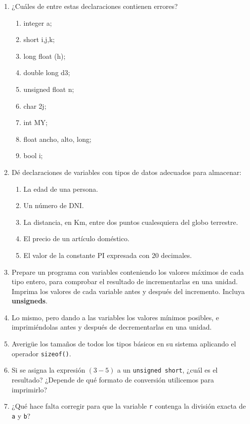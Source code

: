 \begin{enumerate}
	\item ¿Cuáles de entre estas declaraciones contienen errores?
		\begin{multicols}{2}
		\begin{enumerate}[label=\alph*.]
			\item integer a;
			\item short i,j,k;
			\item long float (h);
			\item double long d3;
			\item unsigned float n;
			\item char 2j;
			\item int MY;
			\item float ancho, alto, long;
			\item bool i;
		\end{enumerate}
		\end{multicols}
	\item Dé declaraciones de variables con tipos de datos adecuados para almacenar:
	\begin{enumerate}[label=\alph*.]
		\item La edad de una persona.
		\item Un número de DNI.
		\item La distancia, en Km, entre dos puntos cualesquiera del globo terrestre.
		\item El precio de un artículo doméstico.
		\item El valor de la constante PI expresada con 20 decimales.
	\end{enumerate}
	\item Prepare un programa con variables conteniendo los valores máximos de cada tipo entero, para
comprobar el resultado de incrementarlas en una unidad. Imprima los valores de cada variable antes y
después del incremento. Incluya \textbf{unsigneds}.
	\item Lo mismo, pero dando a las variables los valores mínimos posibles, e imprimiéndolas antes y
después de decrementarlas en una unidad.
	\item Averigüe los tamaños de todos los tipos básicos en su sistema aplicando el operador \lstinline{sizeof()}.
	\item Si se asigna la expresión $(3-5)$ a un \lstinline{unsigned short}, ¿cuál es el resultado? ¿Depende de qué formato de conversión utilicemos para imprimirlo?
	\item ¿Qué hace falta corregir para que la variable \lstinline{r} contenga la división exacta de \lstinline{a} y \lstinline{b}?

\end{enumerate}
